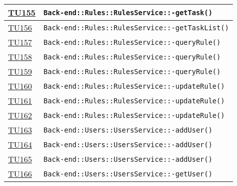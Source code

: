 \begin{longtable}{|>{\centering}m{1cm}|m{12cm}<{\centering}|}
\hyperlink{TU155}{TU155} & \texttt{Back-end::Rules::RulesService::-\linebreak getTask()}\\ \hline

\hyperlink{TU156}{TU156} & \texttt{Back-end::Rules::RulesService::-\linebreak getTaskList()}\\ \hline

\hyperlink{TU157}{TU157} & \texttt{Back-end::Rules::RulesService::-\linebreak queryRule()}\\ \hline

\hyperlink{TU158}{TU158} & \texttt{Back-end::Rules::RulesService::-\linebreak queryRule()}\\ \hline

\hyperlink{TU159}{TU159} & \texttt{Back-end::Rules::RulesService::-\linebreak queryRule()}\\ \hline

\hyperlink{TU160}{TU160} & \texttt{Back-end::Rules::RulesService::-\linebreak updateRule()}\\ \hline

\hyperlink{TU161}{TU161} & \texttt{Back-end::Rules::RulesService::-\linebreak updateRule()}\\ \hline

\hyperlink{TU162}{TU162} & \texttt{Back-end::Rules::RulesService::-\linebreak updateRule()}\\ \hline

\hyperlink{TU163}{TU163} & \texttt{Back-end::Users::UsersService::-\linebreak addUser()}\\ \hline

\hyperlink{TU164}{TU164} & \texttt{Back-end::Users::UsersService::-\linebreak addUser()}\\ \hline

\hyperlink{TU165}{TU165} & \texttt{Back-end::Users::UsersService::-\linebreak addUser()}\\ \hline

\hyperlink{TU166}{TU166} & \texttt{Back-end::Users::UsersService::-\linebreak getUser()}\\ \hline


\end{longtable}

